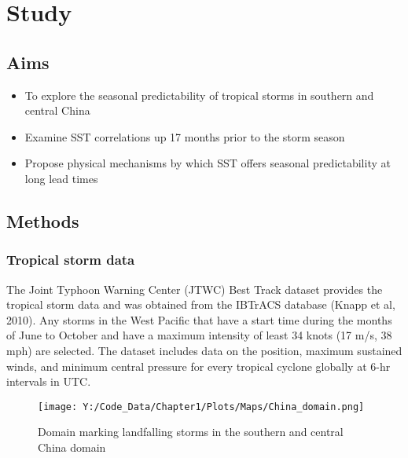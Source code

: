 \chapter{Study}  

\section{Aims}
\begin{itemize}
	\item To explore the seasonal predictability of tropical storms in southern and central China
	\item Examine SST correlations up 17 months prior to the storm season
	\item Propose physical mechanisms by which SST offers seasonal predictability at long lead times

\end{itemize}

\section{Methods}
\subsection{Tropical storm data}

The Joint Typhoon Warning Center (JTWC) Best Track dataset provides the tropical storm data and was obtained from the IBTrACS database (Knapp et al, 2010). Any storms in the West Pacific that have a start time during the months of June to October and have a maximum intensity of least 34 knots (17 m/s, 38 mph) are selected. The dataset includes data on the position, maximum sustained winds, and minimum central pressure for every tropical cyclone globally at 6-hr intervals in UTC.


\begin{figure}[h]
	\centering
	\noindent\texttt{[image: Y:/Code\_Data/Chapter1/Plots/Maps/China\_domain.png]}
	\caption{Domain marking landfalling storms in the southern and central China domain}\label{fig:landfall_domain}
\end{figure}

